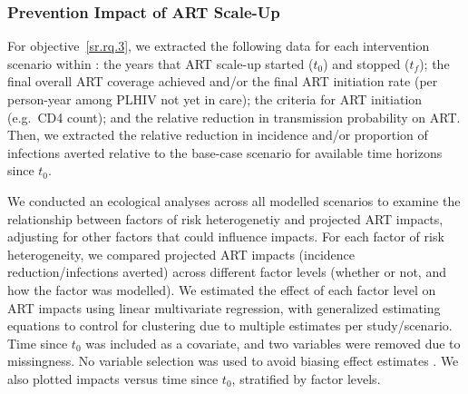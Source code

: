 \subsubsection{Prevention Impact of ART Scale-Up}\label{sr.meth.data.api}
For objective~\ref{sr.rq.3}, we extracted
the following data for each intervention scenario within :
the years that ART scale-up started ($t_0$) and stopped ($t_f$);
the final overall ART coverage achieved and/or
the final ART initiation rate (per person-year among PLHIV not yet in care);
the criteria for ART initiation (e.g.\ CD4 count); and
the relative reduction in transmission probability on ART.
Then, we extracted the
relative reduction in incidence and/or proportion of infections averted
relative to the base-case scenario for available time horizons since $t_0$.
\par
We conducted an ecological analyses across all modelled scenarios to examine the relationship between
factors of risk heterogenetiy and projected ART impacts,
adjusting for other factors that could influence impacts.
For each factor of risk heterogeneity, we compared
projected ART impacts (incidence reduction/infections averted)
across different factor levels (whether or not, and how the factor was modelled).
We estimated the effect of each factor level on ART impacts
using linear multivariate regression, with generalized estimating equations \cite{Hojsgaard2006}
to control for clustering due to multiple estimates per study/scenario.
Time since $t_0$ was included as a covariate, and two variables were removed due to missingness.
No variable selection was used to avoid biasing effect estimates \cite{Harrell2001}.
We also plotted impacts versus time since $t_0$, stratified by factor levels.

